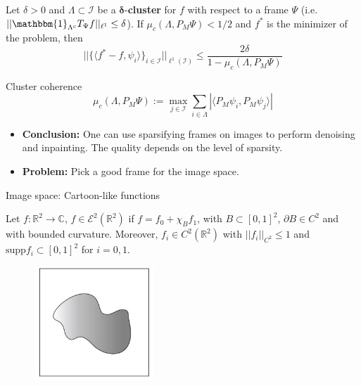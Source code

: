\begin{frame}

\begin{theorem}
Let $\delta>0$ and $\Lambda\subset \mathcal{I}$ be a $\mathbf{\delta}$-\textbf{cluster} for $f$ with respect to a frame $\Psi$ (i.e.\ $||\mathbbm{1}_{\Lambda^c}T_{\Psi}f||_{\ell^1}\leq \delta$). If $\mu_c(\Lambda, P_M\Psi)<1/2$ and $f^*$ is the minimizer of the problem, then
$$
||\{\langle f^*-f,\psi_i\rangle\}_{i\in\mathcal{I}}||_{\ell^1(\mathcal{I})}\leq \frac{2\delta}{1-\mu_c(\Lambda,P_M\Psi)}
$$

\end{theorem}

\medskip

\begin{block}{Cluster coherence}
$$
\mu_c(\Lambda,P_M\Psi) :=\max_{j\in\mathcal{I}} \sum_{i\in \Lambda} |\langle P_M\psi_i,P_M\psi_j\rangle|
$$
\end{block}

\pause
\medskip
\begin{itemize}

\item \textbf{Conclusion:} One can use sparsifying frames on images to perform denoising and inpainting. The quality depends on the level of sparsity. 

\item \textbf{Problem:} Pick a good frame for the image space.
\end{itemize}
\end{frame} 

\begin{frame}{Image space: Cartoon-like functions}
\begin{definition}
Let $f:\mathbb{R}^2\longrightarrow\mathbb{C}$, $f\in\mathcal{E}^2(\mathbb{R}^2)$ if $f= f_0+\chi_B f_1$, with $B\subset [0,1]^2$, $\partial B\in C^2$ and with bounded curvature. Moreover, $f_i\in C^2(\mathbb{R}^2)$ with $||f_i||_{C^2}\leq 1$ and $\text{supp} f_i\subset [0,1]^2$ for $i=0,1$. 
\end{definition}
\pause
\begin{figure}[h!]
\centering
\includegraphics[width=0.4\textwidth]{./Images/cartoon-like.jpg}
\end{figure}
\end{frame}

